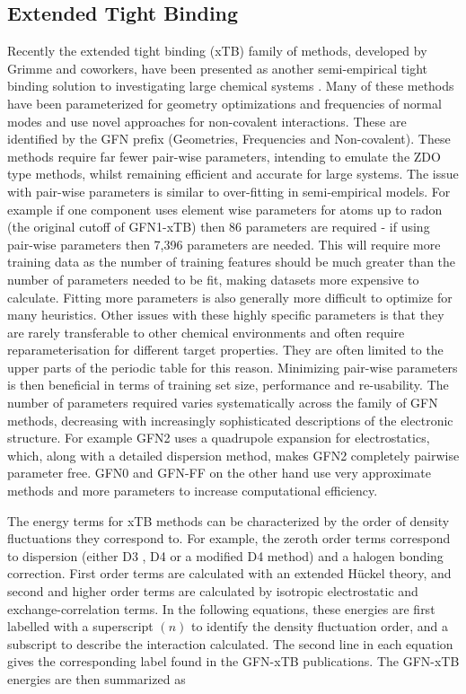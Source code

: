 \subsection{Extended Tight Binding}
\label{subsec:xtb_methods}

Recently the extended tight binding (xTB) family of methods, developed by Grimme 
and coworkers, have been presented as another semi-empirical tight binding solution
to investigating large chemical systems \cite{Bannwarth2020, Bannwarth2019, Grimme2017, Pracht2019, Grimme2016, Spicher2020a}.
Many of these methods have been parameterized for geometry optimizations and frequencies 
of normal modes and use novel approaches for non-covalent interactions. These are
identified by the GFN prefix (Geometries, Frequencies and Non-covalent). These methods
require far fewer pair-wise parameters, intending to emulate the ZDO type methods,
whilst remaining efficient and accurate for large systems. The issue with pair-wise 
parameters is similar to over-fitting in semi-empirical models. For example if one 
component uses element wise parameters for atoms up to radon (the original cutoff 
of GFN1-xTB) then 86 parameters are required - if using pair-wise parameters then 
7,396 parameters are needed. This will require more training data as the number
of training features should be much greater than the number of parameters needed 
to be fit, making datasets more expensive to calculate. Fitting more parameters 
is also generally more difficult to optimize for many heuristics. Other issues with
these highly specific parameters is that they are rarely transferable to other chemical
environments and often require reparameterisation for different target properties. 
They are often limited to the upper parts of the periodic table for this reason. 
Minimizing pair-wise parameters is then beneficial in terms of training set size, 
performance and re-usability. The number of parameters required varies systematically 
across the family of GFN methods, decreasing with increasingly sophisticated descriptions
of the electronic structure. For example GFN2 uses a quadrupole expansion for electrostatics, 
which, along with a detailed dispersion method, makes GFN2 completely pairwise parameter 
free. GFN0 and GFN-FF on the other hand use very approximate methods and more parameters 
to increase computational efficiency. 

The energy terms for xTB methods can be characterized by the order of density fluctuations 
they correspond to. For example, the zeroth order terms correspond to dispersion 
(either D3 \cite{Grimme2010}, D4 \cite{Caldeweyher2020} or a modified D4 method) and
a halogen bonding correction. First order terms are calculated with an extended 
H\"{u}ckel theory, and second and higher order terms are calculated by isotropic
electrostatic and exchange-correlation terms. In the following equations, these energies
are first labelled with a superscript $\left(n\right)$ to identify the density fluctuation 
order, and a subscript to describe the interaction calculated. The second line in
each equation gives the corresponding label found in the GFN-xTB publications. The
GFN-xTB energies are then summarized as

